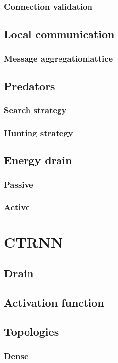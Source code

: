 		\subsubsection{Connection validation}
	\subsection{Local communication}
		\subsubsection{Message aggregation\message lattice}
	\subsection{Predators}
		\subsubsection{Search strategy}
		\subsubsection{Hunting strategy}
	\subsection{Energy drain}
		\subsubsection{Passive}
		\subsubsection{Active}

\section{CTRNN}
	\subsection{Drain}
	\subsection{Activation function}
	\subsection{Topologies}
		\subsubsection{Dense}
